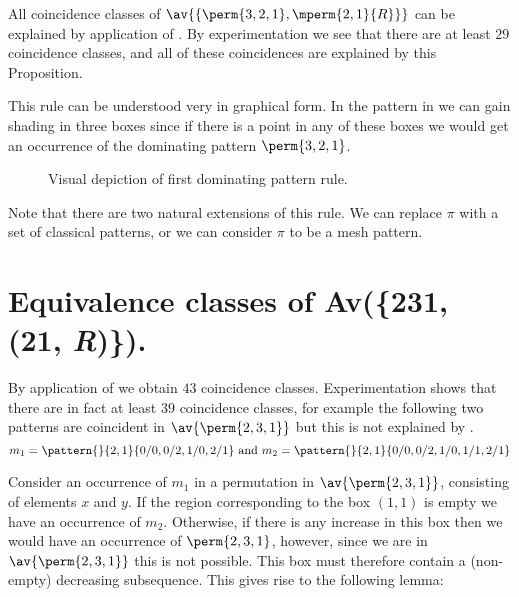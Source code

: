 All coincidence classes of \(\av{\{\perm{3,2,1}, \mperm{2,1}{R}\}}\) can be
explained by application of . By experimentation
we see that there are at least \(29\) coincidence classes, and all of these
coincidences are explained by this Proposition.

This rule can be understood very in graphical form. In the
pattern in  we can gain shading in three boxes since if
there is a point in any of these boxes we would get an occurrence of the
dominating pattern \(\perm{3,2,1}\).

\begin{figure}[htb]
    \begin{center}
        \raisebox{2ex}{\(\mapsto\)}

        \caption{Visual depiction of first dominating pattern rule.}
        \label{fig:rule1}
    \end{center}
\end{figure}

Note that there are two natural extensions of this rule. We can replace \(\pi\)
with a set of classical patterns, or we can consider \(\pi\) to be a mesh pattern.

\section{Equivalence classes of Av(\{231, (21, \textit{R})\}).}
By application of  we obtain \(43\) coincidence
classes. Experimentation shows that there are in fact at least \(39\) coincidence
classes, for example the following two patterns are coincident in
\(\av{\perm{2,3,1}}\) but this is not explained by .
\begin{equation*}
    m_1 = \pattern{}{2,1}{0/0,0/2,1/0,2/1} \text{ and } m_2 = \pattern{}{2,1}{0/0,0/2,1/0,1/1,2/1}
\end{equation*}

Consider an occurrence of \(m_1\) in a permutation in \(\av{\perm{2,3,1}}\), consisting
of elements \(x\) and \(y\). If the region corresponding
to the box \((1,1)\) is empty we have an occurrence of \(m_2\). Otherwise, if there is any
increase in this box then we would have an occurrence of \(\perm{2,3,1}\),
however, since we are in \(\av{\perm{2,3,1}}\) this is not possible. This box
must therefore contain a (non-empty) decreasing subsequence.
 This gives rise to the following lemma:

